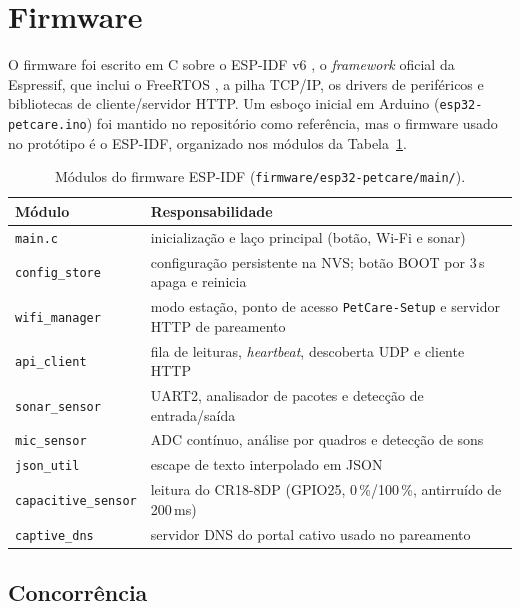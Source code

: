 \section{Firmware}
\label{sec:firmware}

O firmware foi escrito em C sobre o ESP-IDF v6 \citep{espidf}, o \textit{framework} oficial da Espressif, que inclui o FreeRTOS \citep{freertos}, a pilha TCP/IP, os drivers de periféricos e bibliotecas de cliente/servidor HTTP. Um esboço inicial em Arduino (\texttt{esp32-petcare.ino}) foi mantido no repositório como referência, mas o firmware usado no protótipo é o ESP-IDF, organizado nos módulos da Tabela~\ref{tab:modulos}.

\begin{table}[!ht]
\caption{Módulos do firmware ESP-IDF (\texttt{firmware/esp32-petcare/main/}).}
\label{tab:modulos}
\centering
\small
\begin{tabularx}{\linewidth}{>{\hsize=0.667\hsize\raggedright\arraybackslash}X>{\hsize=1.333\hsize\raggedright\arraybackslash}X}
\toprule
\textbf{Módulo} & \textbf{Responsabilidade} \\
\midrule
\texttt{main.c} & inicialização e laço principal (botão, Wi-Fi e sonar) \\
\texttt{config\_store} & configuração persistente na NVS; botão BOOT por 3\,s apaga e reinicia \\
\texttt{wifi\_manager} & modo estação, ponto de acesso \texttt{PetCare-Setup} e servidor HTTP de pareamento \\
\texttt{api\_client} & fila de leituras, \textit{heartbeat}, descoberta UDP e cliente HTTP \\
\texttt{sonar\_sensor} & UART2, analisador de pacotes e detecção de entrada/saída \\
\texttt{mic\_sensor} & ADC contínuo, análise por quadros e detecção de sons \\
\texttt{json\_util} & escape de texto interpolado em JSON \\
\texttt{capacitive\_sensor} & leitura do CR18-8DP (GPIO25, 0\,\%/100\,\%, antirruído de 200\,ms) \\
\texttt{captive\_dns} & servidor DNS do portal cativo usado no pareamento \\
\bottomrule
\end{tabularx}
\end{table}

\subsection{Concorrência}

